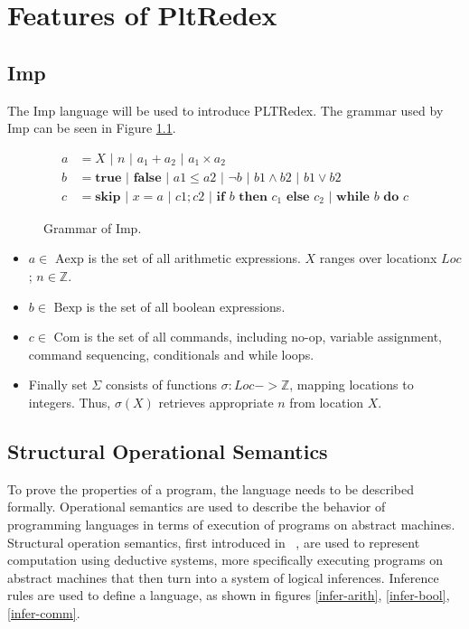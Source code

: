 \chapter{Features of PltRedex}

\section{Imp}
The Imp language will be used to introduce PLTRedex. The grammar used by Imp can be seen in Figure \ref{imp-grammar}.

\begin{figure}[h]
\begin{align*}
a &= X \text{ | } n \text{ | } a_1 + a_2 \text{ | } a_1 \times a_2 \\
b &= \textbf{true} \text{ | } \textbf{false} \text{ | } a1 \leq a2 \text{ | } \neg b \text{ | } b1 \land b2 \text{ | } b1 \lor b2 \\
c &= \textbf{skip} \text{ | } x = a \text{ | } c1; c2 \text{ | } \textbf{if } b \textbf{ then } c_1 \textbf{ else } c_2 \text{ | } \textbf{while } b \textbf{ do } c
\end{align*}
\caption{Grammar of Imp.}
\label{imp-grammar}
\end{figure}

\begin{itemize}
\item $a \in \text{ Aexp}$ is the set of all arithmetic expressions. $X$ ranges over locationx $Loc$; $n \in \mathbb{Z}$.
\item $b \in \text{ Bexp}$ is the set of all boolean expressions.
\item $c \in \text{ Com}$ is the set of all commands, including no-op, variable assignment, command sequencing, conditionals and while loops.
\item Finally set $\Sigma$ consists of functions $\sigma: Loc -> \mathbb{Z}$, mapping locations to integers. Thus, $\sigma(X)$ retrieves appropriate $n$ from location $X$.
\end{itemize}


\section{Structural Operational Semantics}
To prove the properties of a program, the language needs to be described formally. Operational semantics are used to describe the behavior of programming languages in terms of execution of programs on abstract machines. Structural operation semantics, first introduced in ~\cite{plotkin}, are used to represent computation using deductive systems, more specifically executing programs on abstract machines that then turn into a system of logical inferences. Inference rules are used to define a language, as shown in figures \ref{infer-arith}, \ref{infer-bool}, \ref{infer-comm}.

